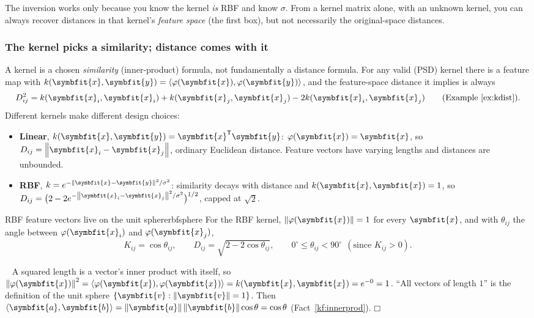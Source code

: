 \documentclass[11pt]{article}
\newcommand{\bm}[1]{\symbfit{#1}}
\newenvironment{proofsketch}{\par\noindent{\itshape Proof.}\ }{\hfill$\mdlgwhtsquare$\par}
\newcommand{\vx}{\bm{x}}
\newcommand{\T}{^{\mathsf T}}
\newcommand{\norm}[1]{\left\lVert #1\right\rVert}
\begin{document}
\begin{careful}
The inversion works only because you know the kernel \emph{is} RBF and know $\sigma$. From a kernel matrix alone, with an
unknown kernel, you can always recover distances in that kernel's \emph{feature space} (the first box), but not
necessarily the original-space distances.
\end{careful}

\subsubsection*{The kernel picks a similarity; distance comes with it}

A kernel is a chosen \emph{similarity} (inner-product) formula, not fundamentally a distance formula. For any valid
(PSD) kernel there is a feature map with $k(\vx,\bm y)=\langle\varphi(\vx),\varphi(\bm y)\rangle$, and the feature-space distance it implies is always
\[
D_{ij}^2=k(\vx_i,\vx_i)+k(\vx_j,\vx_j)-2k(\vx_i,\vx_j)\qquad(\text{Example~\ref{ex:kdist}}).
\]
Different kernels make different design choices:
\begin{itemize}[nosep]
\item \textbf{Linear}, $k(\vx,\bm y)=\vx\T\bm y$: $\varphi(\vx)=\vx$, so $D_{ij}=\norm{\vx_i-\vx_j}$, ordinary Euclidean distance. Feature vectors have varying lengths and
distances are unbounded.
\item \textbf{RBF}, $k=e^{-\norm{\vx-\bm y}^2/\sigma^2}$: similarity decays with distance and $k(\vx,\vx)=1$, so
$D_{ij}=\big(2-2e^{-\norm{\vx_i-\vx_j}^2/\sigma^2}\big)^{1/2}$, capped at $\sqrt2$.
\end{itemize}

\begin{proposition}{RBF feature vectors live on the unit sphere}{rbfsphere}
For the RBF kernel, $\norm{\varphi(\vx)}=1$ for every $\vx$, and with $\theta_{ij}$ the angle between $\varphi(\vx_i)$ and $\varphi(\vx_j)$,
\[
K_{ij}=\cos\theta_{ij},\qquad D_{ij}=\sqrt{2-2\cos\theta_{ij}},\qquad 0^\circ\le\theta_{ij}<90^\circ\ \ (\text{since }K_{ij}>0).
\]
\end{proposition}
\begin{proofsketch}
A squared length is a vector's inner product with itself, so $\norm{\varphi(\vx)}^2=\langle\varphi(\vx),\varphi(\vx)\rangle=k(\vx,\vx)=e^{-0}=1$. ``All vectors of length $1$'' is the
definition of the unit sphere $\{\bm v:\norm{\bm v}=1\}$. Then $\langle\bm a,\bm b\rangle=\norm{\bm a}\norm{\bm b}\cos\theta=\cos\theta$ (Fact~\ref{kf:innerprod}).
\end{proofsketch}
\end{document}
